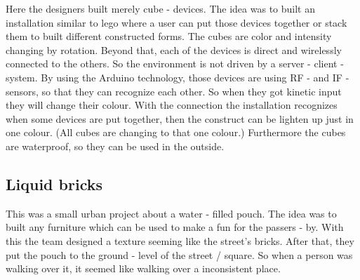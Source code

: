 Here the designers built merely cube - devices. \newline
The idea was to built an installation similar to lego \texttrademark where a user can put those devices together or stack them to built different constructed forms. \newline
The cubes are color and intensity changing by rotation. Beyond that, each of the devices is direct and wirelessly connected to the others. So the environment is not driven by a server - client - system.\newline
By using the Arduino technology, those devices are using RF - and IF - sensors, so that they can recognize each other. So when they got kinetic input they will change their colour. With the connection the installation recognizes when some devices are put together, then the construct can be lighten up just in one colour. (All cubes are changing to that one colour.)\newline
 Furthermore the cubes are waterproof, so they can be used in the outside.\newline
{} \newline

\subsection{Liquid bricks}

 
This was a small urban project about a water - filled pouch. \newline
The idea was to built any furniture which can be used to make a fun for the passers - by. With this the team designed a texture seeming like the street's bricks. After that, they put the pouch to the ground - level of the street / square. So when a person was walking over it, it seemed like walking over a inconsistent place.\newline
{}\newline

